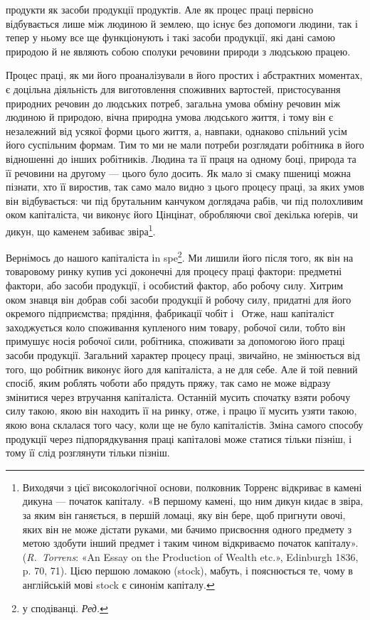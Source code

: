 \parcont{}  %
продукти як засоби продукції продуктів. Але як процес праці
первісно відбувається лише між людиною й землею, що існує
без допомоги людини, так і тепер у ньому все ще функціонують
і такі засоби продукції, які дані самою природою й не являють
собою сполуки речовини природи з людською працею.

Процес праці, як ми його проаналізували в його простих і абстрактних
моментах, є доцільна діяльність для виготовлення
споживних вартостей, пристосування природних речовин до
людських потреб, загальна умова обміну речовин між людиною
й природою, вічна природна умова людського життя, і тому він
є незалежний від усякої форми цього життя, а, навпаки, однаково
спільний усім його суспільним формам. Тим то ми не мали
потреби розглядати робітника в його відношенні до інших робітників.
Людина та її праця на одному боці, природа та її речовини
на другому — цього було досить. Як мало зі смаку пшениці
можна пізнати, хто її виростив, так само мало видно з цього процесу
праці, за яких умов він відбувається: чи під брутальним
канчуком доглядача рабів, чи під полохливим оком капіталіста,
чи виконує його Цінцінат, обробляючи свої декілька юґерів,
чи дикун, що каменем забиває звіра\footnote{
Виходячи з цієї високологічної основи, полковник Торренс відкриває
в камені дикуна — початок капіталу. «В першому камені, що ним
дикун кидає в звіра, за яким він ганяється, в першій ломаці, яку він бере,
щоб пригнути овочі, яких він не може дістати руками, ми бачимо присвоєння
одного предмету з метою здобути інший предмет і таким чином
відкриваємо початок капіталу». (\emph{R.~Torrens}: «An Essay on the
Production of Wealth etc.», Edinburgh 1836, p. 70, 71). Цією першою
ломакою (stock), мабуть, і пояснюється те, чому в англійській мові stock
є синонім капіталу.
}.

Вернімось до нашого капіталіста іn spe\footnote*{
у сподіванці. \emph{Ред.}
}. Ми лишили його
після того, як він на товаровому ринку купив усі доконечні
для процесу праці фактори: предметні фактори, або засоби продукції,
і особистий фактор, або робочу силу. Хитрим оком знавця
він добрав собі засоби продукції й робочу силу, придатні для
його окремого підприємства; прядіння, фабрикації чобіт і~
Отже, наш капіталіст заходжується коло споживання купленого
ним товару, робочої сили, тобто він примушує носія робочої сили,
робітника, споживати за допомогою його праці засоби продукції.
Загальний характер процесу праці, звичайно, не змінюється від
того, що робітник виконує його для капіталіста, а не для себе.
Але й той певний спосіб, яким роблять чоботи або прядуть пряжу,
так само не може відразу змінитися через втручання капіталіста.
Останній мусить спочатку взяти робочу силу такою, якою він
находить її на ринку, отже, і працю її мусить узяти такою, якою
вона склалася того часу, коли ще не було капіталістів. Зміна
самого способу продукції через підпорядкування праці капіталові
може статися тільки пізніш, і тому її слід розглянути
тільки пізніш.
